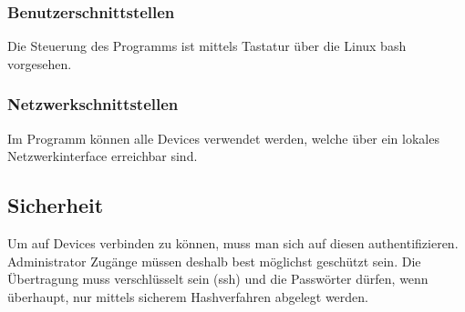 \documentclass[a4,12pt]{scrartcl}
\begin{document}
\subsubsection{Benutzerschnittstellen}
Die Steuerung des Programms ist mittels Tastatur über die Linux bash vorgesehen.

\subsubsection{Netzwerkschnittstellen}
Im Programm können alle Devices verwendet werden, welche über ein lokales Netzwerkinterface erreichbar sind.

\subsection{Sicherheit}
Um auf Devices verbinden zu können, muss man sich auf diesen authentifizieren. Administrator Zugänge müssen deshalb best möglichst geschützt sein. Die Übertragung muss verschlüsselt sein (ssh) und die Passwörter dürfen, wenn überhaupt, nur mittels sicherem Hashverfahren abgelegt werden.
\end{document}
